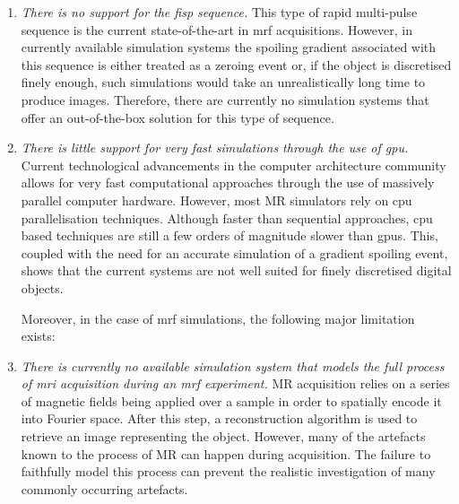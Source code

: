 \begin{enumerate}
    \item \textit{There is no support for the \ac{fisp} sequence.}
    This type of rapid multi-pulse sequence is the current state-of-the-art in \ac{mrf} acquisitions.
    However, in currently available simulation systems the spoiling gradient associated with this sequence is either treated as a zeroing event or, if the object is discretised finely enough, such simulations would take an unrealistically long time to produce images.
    Therefore, there are currently no simulation systems that offer an out-of-the-box solution for this type of sequence.
    
    
    \item \textit{There is little support for very fast simulations through the use of \ac{gpu}.}
    Current technological advancements in the computer architecture community allows for very fast computational approaches through the use of massively parallel computer hardware.
    However, most MR simulators rely on \ac{cpu} parallelisation techniques.
    Although faster than sequential approaches, \ac{cpu} based techniques are still a few orders of magnitude slower than \ac{gpu}s.
    This, coupled with the need for an accurate simulation of a gradient spoiling event, shows that the current systems are not well suited for finely discretised digital objects. \\

    \hfill

	Moreover, in the case of \ac{mrf} simulations, the following major limitation exists: \\

    \item \textit{There is currently no available simulation system that models the full process of \ac{mri} acquisition during an \ac{mrf} experiment.}
    MR acquisition relies on a series of magnetic fields being applied over a sample in order to spatially encode it into Fourier space.
    After this step, a reconstruction algorithm is used to retrieve an image representing the object.
    However, many of the artefacts known to the process of MR can happen during acquisition.
    The failure to faithfully model this process can prevent the realistic investigation of many commonly occurring artefacts.
\end{enumerate}

